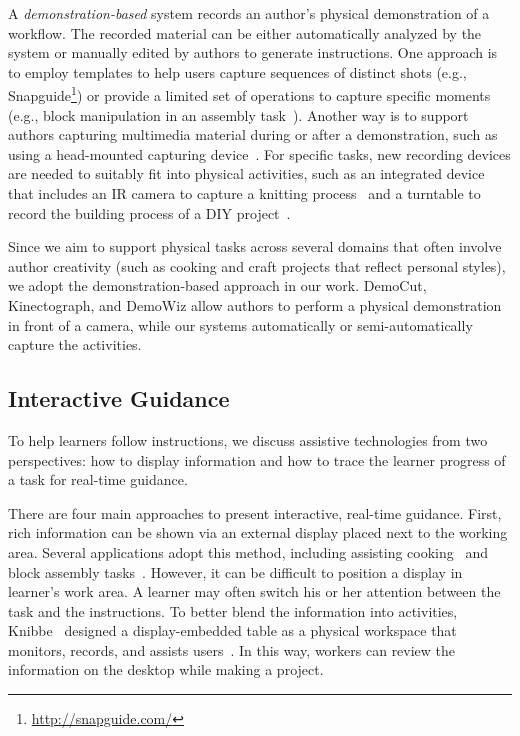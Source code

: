 A \emph{demonstration-based} system records an author's physical demonstration of a workflow. The recorded material can be either automatically analyzed by the system or manually edited by authors to generate instructions.
%
One approach is to employ templates to help users capture sequences of distinct shots (e.g., Snapguide\footnote{\url{http://snapguide.com/}}) or provide a limited set of operations to capture specific moments (e.g., block manipulation in an assembly task~\cite{Ranjan:2007,Gupta:2012ku}).
%
Another way is to support authors capturing multimedia material during or after a demonstration, such as using a head-mounted capturing device~\cite{carter2015authoring}. For specific tasks, new recording devices are needed to suitably fit into physical activities, such as an integrated device that includes an IR camera to capture a knitting process~\cite{Rosner:2008:SAK:1409635.1409682} and a turntable to record the building process of a DIY project~\cite{Tseng:2015:SPT:2771839.2771869}.

Since we aim to support physical tasks across several domains that often involve author creativity (such as cooking and craft projects that reflect personal styles), we adopt the demonstration-based approach in our work. DemoCut, Kinectograph, and DemoWiz allow authors to perform a physical demonstration in front of a camera, while our systems automatically or semi-automatically capture the activities.


\subsection{Interactive Guidance}
To help learners follow instructions, we discuss assistive technologies from two perspectives: how to display information and how to trace the learner progress of a task for real-time guidance.

There are four main approaches to present interactive, real-time guidance. First, rich information can be shown via an external display placed next to the working area. Several applications adopt this method, including assisting cooking~\cite{Uriu:2012:PRM:2207676.2207695} and block assembly tasks~\cite{Gupta:2012ku,Wu:2016:ARI:2856400.2856416}. However, it can be difficult to position a display in learner's work area. A learner may often switch his or her attention between the task and the instructions. To better blend the information into activities, Knibbe~\ea{} designed a display-embedded table as a physical workspace that monitors, records, and assists users~\cite{Knibbe:2015:SMI:2817721.2817741}. In this way, workers can review the information on the desktop while making a project.

